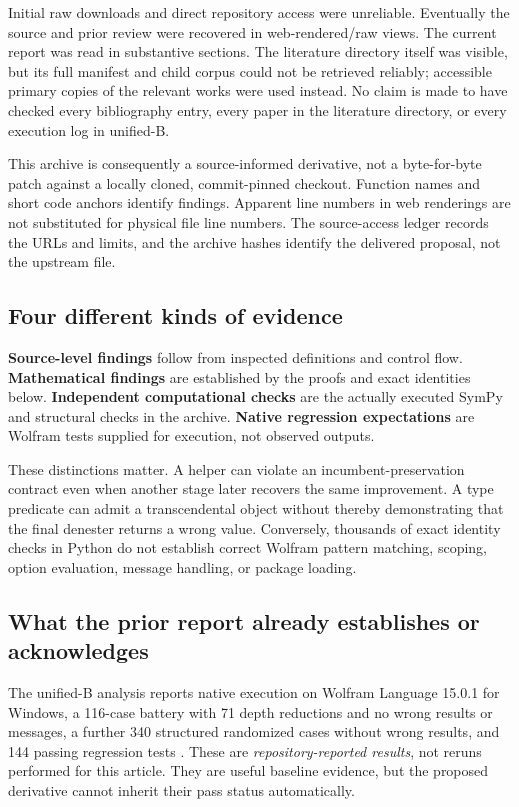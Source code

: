 \documentclass[11pt,letterpaper]{article}
\numberwithin{equation}{section}
\theoremstyle{definition}\newtheorem{definition}[theorem]{Definition}
\theoremstyle{remark}\newtheorem{remark}[theorem]{Remark}
\begin{document}
Initial raw downloads and direct repository access were unreliable. Eventually the source and prior review were recovered in web-rendered/raw views. The current report was read in substantive sections. The literature directory itself was visible, but its full manifest and child corpus could not be retrieved reliably; accessible primary copies of the relevant works were used instead. No claim is made to have checked every bibliography entry, every paper in the literature directory, or every execution log in unified-B.

This archive is consequently a source-informed derivative, not a byte-for-byte patch against a locally cloned, commit-pinned checkout. Function names and short code anchors identify findings. Apparent line numbers in web renderings are not substituted for physical file line numbers. The source-access ledger records the URLs and limits, and the archive hashes identify the delivered proposal, not the upstream file.

\subsection{Four different kinds of evidence}
\textbf{Source-level findings} follow from inspected definitions and control flow. \textbf{Mathematical findings} are established by the proofs and exact identities below. \textbf{Independent computational checks} are the actually executed SymPy and structural checks in the archive. \textbf{Native regression expectations} are Wolfram tests supplied for execution, not observed outputs.

These distinctions matter. A helper can violate an incumbent-preservation contract even when another stage later recovers the same improvement. A type predicate can admit a transcendental object without thereby demonstrating that the final denester returns a wrong value. Conversely, thousands of exact identity checks in Python do not establish correct Wolfram pattern matching, scoping, option evaluation, message handling, or package loading.

\subsection{What the prior report already establishes or acknowledges}
The unified-B analysis reports native execution on Wolfram Language 15.0.1 for Windows, a 116-case battery with 71 depth reductions and no wrong results or messages, a further 340 structured randomized cases without wrong results, and 144 passing regression tests \cite{prior}. These are \emph{repository-reported results}, not reruns performed for this article. They are useful baseline evidence, but the proposed derivative cannot inherit their pass status automatically.
\end{document}
